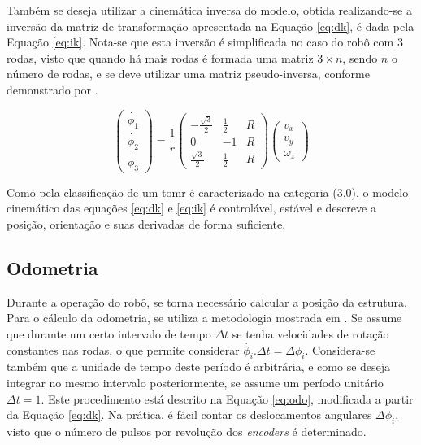 Também se deseja utilizar a cinemática inversa do modelo, obtida realizando-se a inversão da matriz de transformação apresentada na Equação \ref{eq:dk}, é dada pela Equação \ref{eq:ik}. Nota-se que esta inversão é simplificada no caso do robô com 3 rodas, visto que quando há mais rodas é formada uma matriz $3 \times n$, sendo $n$ o número de rodas, e se deve utilizar uma matriz pseudo-inversa, conforme demonstrado por \cite{rojas2006holonomic}.

\begin{equation}
  \begin{pmatrix}
    \dot{\phi_1} \\
    \dot{\phi_2} \\
    \dot{\phi_3}
  \end{pmatrix}
  =
  \frac{1}{r}
  \begin{pmatrix}
    -\frac{\sqrt{3}}{2} & \frac{1}{2} & R \\
    0                   & -1          & R \\
    \frac{\sqrt{3}}{2}  & \frac{1}{2} & R
  \end{pmatrix}
  \begin{pmatrix}
    v_x \\
    v_y \\
    \omega_z
  \end{pmatrix}
  \label{eq:ik}
\end{equation}

Como pela classificação de \cite{campion1996structural} um \acrshort{tomr} é caracterizado na categoria (3,0), o modelo cinemático das equações \ref{eq:dk} e \ref{eq:ik} é controlável, estável e descreve a posição, orientação e suas derivadas de forma suficiente. %

\subsection{Odometria}

Durante a operação do robô, se torna necessário calcular a posição da estrutura. Para o cálculo da odometria, se utiliza a metodologia mostrada em \cite{lynch2017modern}. Se assume que durante um certo intervalo de tempo $\Delta t$ se tenha velocidades de rotação constantes nas rodas, o que permite considerar $\dot{\phi_i}.\Delta t = \Delta \phi_i$. Considera-se também que a unidade de tempo deste período é arbitrária, e como se deseja integrar no mesmo intervalo posteriormente, se assume um período unitário $\Delta t = 1$. Este procedimento está descrito na Equação \ref{eq:odo}, modificada a partir da Equação \ref{eq:dk}. Na prática, é fácil contar os deslocamentos angulares $\Delta \phi_i$, visto que o número de pulsos por revolução dos \textit{encoders} é determinado.

